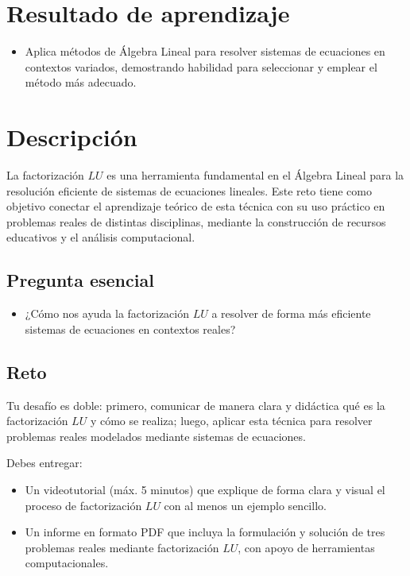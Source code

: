 \documentclass[a4,11pt]{aleph-notas}
\begin{document}
\encabezado

\section{Resultado de aprendizaje}

\begin{itemize}
\item 
    Aplica métodos de Álgebra Lineal para resolver sistemas de ecuaciones en contextos variados, demostrando habilidad para seleccionar y emplear el método más adecuado.
\end{itemize}


\section{Descripción}  

La factorización $LU$ es una herramienta fundamental en el Álgebra Lineal para la resolución eficiente de sistemas de ecuaciones lineales. Este reto tiene como objetivo conectar el aprendizaje teórico de esta técnica con su uso práctico en problemas reales de distintas disciplinas, mediante la construcción de recursos educativos y el análisis computacional.

\subsection*{Pregunta esencial}  
\begin{itemize}[leftmargin=*]
\item ¿Cómo nos ayuda la factorización $LU$ a resolver de forma más eficiente sistemas de ecuaciones en contextos reales?
\end{itemize}

\subsection*{Reto}  

Tu desafío es doble: primero, comunicar de manera clara y didáctica qué es la factorización $LU$ y cómo se realiza; luego, aplicar esta técnica para resolver problemas reales modelados mediante sistemas de ecuaciones.

Debes entregar:
\begin{itemize}[leftmargin=*]
\item Un videotutorial (máx. 5 minutos) que explique de forma clara y visual el proceso de factorización $LU$ con al menos un ejemplo sencillo.
\item Un informe en formato PDF que incluya la formulación y solución de tres problemas reales mediante factorización $LU$, con apoyo de herramientas computacionales.
\end{itemize}
\end{document}
